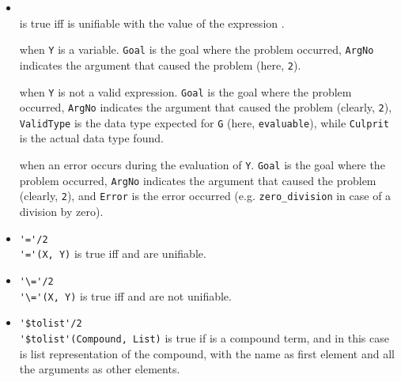 \begin{itemize}

\item {}\\
    \noindent{} is true iff  is unifiable with the value of the expression .


     when \texttt{Y} is a variable. \texttt{Goal} is the goal where the problem occurred, \texttt{ArgNo} indicates the argument that caused the problem (here, \texttt{2}).

     when \texttt{Y} is not a valid expression. \texttt{Goal} is the goal where the problem occurred, \texttt{ArgNo} indicates the argument that caused the problem (clearly, \texttt{2}), \texttt{ValidType} is the data type expected for \texttt{G} (here, \texttt{evaluable}), while \texttt{Culprit} is the actual data type found.

     when an error occurs during the evaluation of \texttt{Y}. \texttt{Goal} is the goal where the problem occurred, \texttt{ArgNo} indicates the argument that caused the problem (clearly, \texttt{2}), and \texttt{Error} is the error occurred (e.g. \texttt{zero\_division} in case of a division by zero).

\item \verb|'='/2|\\
    \noindent\verb|'='(X, Y)| is true iff  and  are unifiable.


\item \verb|'\='/2|\\
    \noindent\verb|'\='(X, Y)| is true iff  and  are not unifiable.


\item \verb|'$tolist'/2|\\
    \noindent\verb|'$tolist'(Compound, List)| is true if  is a compound term, and in this case  is list representation of the compound, with the name as first element and all the arguments as other elements.


\end{itemize}
